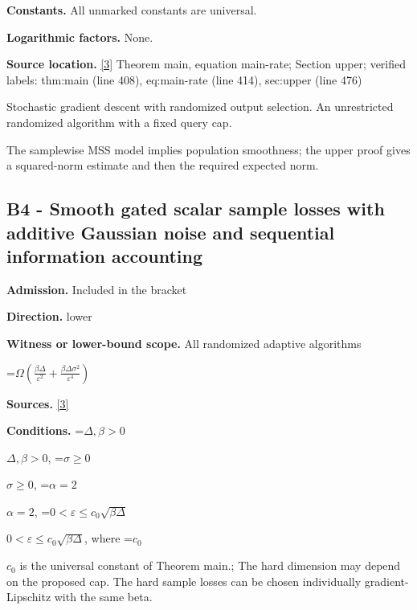 \documentclass[10pt,a4paper]{article}
\newcommand{\AtlasMath}[1]{\par\begingroup\centering\setbox0=\hbox{$\displaystyle #1$}\ifdim\wd0>1.4\linewidth\typeout{ATLAS WIDE FORMULA: \the\wd0}\fi\ifdim\wd0>\linewidth\resizebox{\linewidth}{!}{\box0}\else\box0\fi\par\endgroup}
\newcommand{\AtlasInlineMath}[1]{\begingroup\setbox0=\hbox{$#1$}\ifdim\wd0>.4\linewidth\endgroup\AtlasMath{#1}\else\endgroup$#1$\fi}
\begin{document}
\textbf{Constants.} All unmarked constants are universal.



\textbf{Logarithmic factors.} None.



\textbf{Source location.} \href{https://github.com/WU-Wendao/Colombo/blob/main/colombo_sensorium/Complexity_altas/data/sources/colombo/0902/manuscript.pdf}{[3]} Theorem main, equation main-rate; Section upper; verified labels: thm:main (line 408), eq:main-rate (line 414), sec:upper (line 476)



Stochastic gradient descent with randomized output selection. An unrestricted randomized algorithm with a fixed query cap.



The samplewise MSS model implies population smoothness; the upper proof gives a squared-norm estimate and then the required expected norm.



\subsection{B4 - Smooth gated scalar sample losses with additive Gaussian noise and sequential information accounting}


\textbf{Admission.} Included in the bracket



\textbf{Direction.} lower



\textbf{Witness or lower-bound scope.} All randomized adaptive algorithms



\AtlasMath{\Omega\!\left(\frac{\beta\Delta}{\varepsilon^2}+\frac{\beta\Delta\sigma^2}{\varepsilon^4}\right)}


\textbf{Sources.} \href{https://github.com/WU-Wendao/Colombo/blob/main/colombo_sensorium/Complexity_altas/data/sources/colombo/0902/manuscript.pdf}{[3]}



\textbf{Conditions.} \AtlasInlineMath{\Delta,\beta>0}, \AtlasInlineMath{\sigma\ge0}, \AtlasInlineMath{\alpha=2}, \AtlasInlineMath{0<\varepsilon\le c_0\sqrt{\beta\Delta}}, where \AtlasInlineMath{c_0} is the universal constant of Theorem main.; The hard dimension may depend on the proposed cap. The hard sample losses can be chosen individually gradient-Lipschitz with the same beta.
\end{document}

